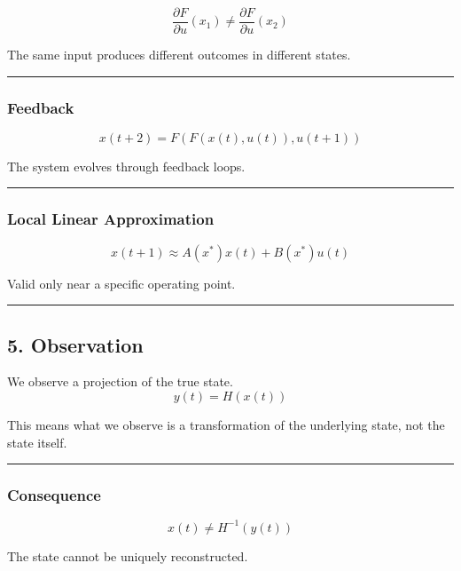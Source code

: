 \documentclass[
  letterpaper,
  DIV=11,
  numbers=noendperiod]{scrartcl}
\begin{document}
\[
\frac{\partial F}{\partial u}(x_1) \neq \frac{\partial F}{\partial u}(x_2)
\]

The same input produces different outcomes in different states.

\begin{center}\rule{0.5\linewidth}{0.5pt}\end{center}

\subsubsection{Feedback}\label{feedback}

\[
x(t+2) = F(F(x(t), u(t)), u(t+1))
\]

The system evolves through feedback loops.

\begin{center}\rule{0.5\linewidth}{0.5pt}\end{center}

\subsubsection{Local Linear
Approximation}\label{local-linear-approximation}

\[
x(t+1) \approx A(x^*)x(t) + B(x^*)u(t)
\]

Valid only near a specific operating point.

\begin{center}\rule{0.5\linewidth}{0.5pt}\end{center}

\subsection{5. Observation}\label{observation}

We observe a projection of the true state. \[
y(t) = H(x(t))
\]

This means what we observe is a transformation of the underlying state,
not the state itself.

\begin{center}\rule{0.5\linewidth}{0.5pt}\end{center}

\subsubsection{Consequence}\label{consequence}

\[
x(t) \neq H^{-1}(y(t))
\]

The state cannot be uniquely reconstructed.
\end{document}
